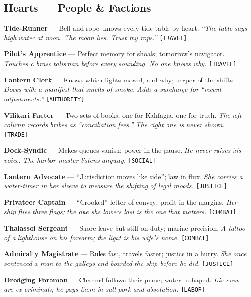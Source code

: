 \subsection*{Hearts --- People \& Factions}
\label{sec:kahfagia-people}

\begin{enumerate}[label={[\Alph*]}]
\setcounter{enumi}{1}
\item \textbf{Tide-Runner} --- Bell and rope; knows every tide-table by heart. \hfill \textit{``The table says high water at noon. The moon lies. Trust my rope.''} \texttt{[TRAVEL]}
\item \textbf{Pilot's Apprentice} --- Perfect memory for shoals; tomorrow's navigator. \hfill \textit{Touches a brass talisman before every sounding. No one knows why.} \texttt{[TRAVEL]}
\item \textbf{Lantern Clerk} --- Knows which lights moved, and why; keeper of the shifts. \hfill \textit{Docks with a manifest that smells of smoke. Adds a surcharge for ``recent adjustments.''} \texttt{[AUTHORITY]}
\item \textbf{Vilikari Factor} --- Two sets of books; one for Kahfagia, one for truth. \hfill \textit{The left column records bribes as ``conciliation fees.'' The right one is never shown.} \texttt{[TRADE]}
\item \textbf{Dock-Syndic} --- Makes queues vanish; power in the pause. \hfill \textit{He never raises his voice. The harbor master listens anyway.} \texttt{[SOCIAL]}
\item \textbf{Lantern Advocate} --- ``Jurisdiction moves like tide''; law in flux. \hfill \textit{She carries a water-timer in her sleeve to measure the shifting of legal moods.} \texttt{[JUSTICE]}
\item \textbf{Privateer Captain} --- ``Crooked'' letter of convoy; profit in the margins. \hfill \textit{Her ship flies three flags; the one she lowers last is the one that matters.} \texttt{[COMBAT]}
\item \textbf{Thalassoi Sergeant} --- Shore leave but still on duty; marine precision. \hfill \textit{A tattoo of a lighthouse on his forearm; the light is his wife's name.} \texttt{[COMBAT]}
\item \textbf{Admiralty Magistrate} --- Rules fast, travels faster; justice in a hurry. \hfill \textit{She once sentenced a man to the galleys and boarded the ship before he did.} \texttt{[JUSTICE]}
\item \textbf{Dredging Foreman} --- Channel follows their purse; water reshaped. \hfill \textit{His crew are ex-criminals; he pays them in salt pork and absolution.} \texttt{[LABOR]}

\end{enumerate}
